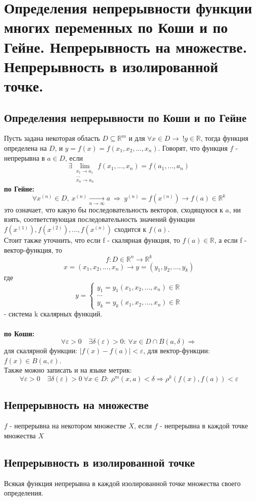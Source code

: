 \section{Определения непрерывности функции многих переменных по Коши и по Гейне. 
	Непрерывность на множестве. 
	Непрерывность в изолированной точке.}
\subsection{Определения непрерывности по Коши и по Гейне}
	Пусть задана некоторая область $D \subseteq \mathbb{R}^m$ и для $ \forall x \in D \rightarrow \ ! y \in \mathbb{R}$, тогда функция определена на $D$, и $y=f(x)=f(x_{1}, x_{2}, ... , x_{n})$. Говорят, что функция $f$ - непрерывна в $a \in D$, если
	$$ 
		\exists \lim_{\substack{x_{1}\to a_{1}\\ ... \\{x_{n}\to a_{n}}}}{f(x_{1},..., x_{n})} = f(a_{1},..., a_{n})
	$$
	\textbf{по Гейне:}
	$$
		\forall x^{(n)} \in D, \ x^{(n)} \underset{n \rightarrow \infty}{\longrightarrow} a \ \Rightarrow \
		y^{(n)} = f(x^{(n)}) \rightarrow f(a) \in \mathbb{R}^{k}
	$$
	это означает, что какую бы последовательность векторов, сходящуюся к $a$, ни взять, соответствующая последовательность значений функции
	$
		f(x^{(1)}), f(x^{(2)}), ..., f(x^{(n)})
	$
	сходится к $f(a)$. \\
	Стоит также уточнить, что если f - скалярная функция, то $f(a) \in \mathbb{R}$, а если f - вектор-функция, то
	$$
		f: D \in \mathbb{R}^{n} \rightarrow \mathbb{R}^{k}
	$$
	$$
		x = (x_{1}, x_{2}, ... , x_{n}) \rightarrow y = (y_{1}, y_{2}, ... , y_{k})
	$$
	где
	\begin{equation*}
	y = 
	\begin{cases}
	y_{1} =y_{1}(x_{1}, x_{2}, ... , x_{n}) \in \mathbb{R}\\
	... \\
	y_{k} =y_{k}(x_{1}, x_{2}, ... , x_{n}) \in \mathbb{R}
	\end{cases}
	\end{equation*}
	- система k скалярных функций.
	\\\\
	\textbf{по Коши:}
	$$
		\forall \varepsilon>0 \quad \exists \delta(\varepsilon)>0 :\ \forall x \in D \cap B(a, \delta)
		\Rightarrow 
	$$
	для скалярной функции: $|f(x) - f(a)| < \varepsilon$,
	для вектор-функции: $f(x) \in B(a, \varepsilon)$.\\
	Также можно записать и на языке метрик:
	$$
	\forall \varepsilon>0 \quad \exists \delta(\varepsilon)>0 \ \forall x \in D :\ \rho^{m}(x,a) < \delta
	\Rightarrow \rho^{k}(f(x), f(a)) < \varepsilon
	$$
\subsection{Непрерывность на множестве}
	$f$ - непрерывна на некотором множестве $X$, если $f$ - непрерывна в каждой точке множества $X$
	
\subsection{Непрерывность в изолированной точке}	
	 Всякая функция непрерывна в каждой изолированной точке множества своего определения.
	